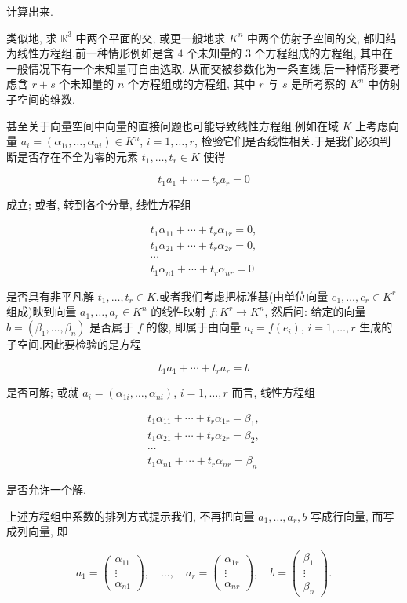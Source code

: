 计算出来.

类似地, 求 $\mathbb{R}^3$ 中两个平面的交, 或更一般地求 $K^n$ 中两个仿射子空间的交, 都归结为线性方程组.前一种情形例如是含 $4$ 个未知量的 $3$ 个方程组成的方程组, 其中在一般情况下有一个未知量可自由选取, 从而交被参数化为一条直线.后一种情形要考虑含 $r + s$ 个未知量的 $n$ 个方程组成的方程组, 其中 $r$ 与 $s$ 是所考察的 $K^n$ 中仿射子空间的维数.

甚至关于向量空间中向量的直接问题也可能导致线性方程组.例如在域 $K$ 上考虑向量 $a_i = (\alpha_{1i}, \ldots, \alpha_{ni}) \in K^n$, $i = 1, \ldots, r$, 检验它们是否线性相关.于是我们必须判断是否存在不全为零的元素 $t_1, \ldots, t_r \in K$ 使得

\[
t_1 a_1 + \cdots + t_r a_r = 0
\]

成立; 或者, 转到各个分量, 线性方程组

\[
\begin{array}{c}
t_1\alpha_{11} + \cdots + t_r\alpha_{1r} = 0, \\
t_1\alpha_{21} + \cdots + t_r\alpha_{2r} = 0, \\
\cdots \\
t_1\alpha_{n1} + \cdots + t_r\alpha_{nr} = 0
\end{array}
\]

是否具有非平凡解 $t_1, \ldots, t_r \in K$.或者我们考虑把标准基(由单位向量 $e_1, \ldots, e_r \in K^r$ 组成)映到向量 $a_1, \ldots, a_r \in K^n$ 的线性映射 $f \colon K^r \longrightarrow K^n$, 然后问: 给定的向量 $b = (\beta_1, \ldots, \beta_n)$ 是否属于 $f$ 的像, 即属于由向量 $a_i = f(e_i)$, $i = 1, \ldots, r$ 生成的子空间.因此要检验的是方程

\[
t_1 a_1 + \cdots + t_r a_r = b
\]

是否可解; 或就 $a_i = (\alpha_{1i}, \ldots, \alpha_{ni})$, $i = 1, \ldots, r$ 而言, 线性方程组

\[
\begin{array}{c}
t_1\alpha_{11} + \cdots + t_r\alpha_{1r} = \beta_1, \\
t_1\alpha_{21} + \cdots + t_r\alpha_{2r} = \beta_2, \\
\cdots \\
t_1\alpha_{n1} + \cdots + t_r\alpha_{nr} = \beta_n
\end{array}
\]

是否允许一个解.

上述方程组中系数的排列方式提示我们, 不再把向量 $a_1, \ldots, a_r, b$ 写成行向量, 而写成列向量, 即

\[
a_1 = \begin{pmatrix} \alpha_{11} \\ \vdots \\ \alpha_{n1} \end{pmatrix}, \quad
\ldots, \quad
a_r = \begin{pmatrix} \alpha_{1r} \\ \vdots \\ \alpha_{nr} \end{pmatrix}, \quad
b = \begin{pmatrix} \beta_1 \\ \vdots \\ \beta_n \end{pmatrix}\text{.}
\]

